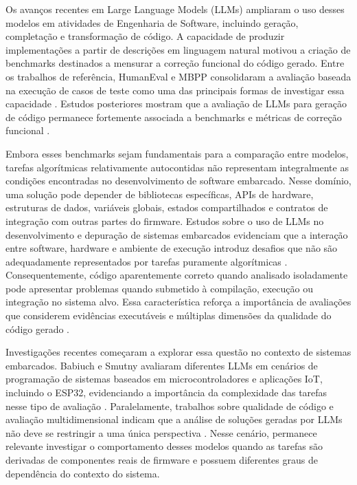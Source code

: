 \documentclass[12pt]{article}
\begin{document}
Os avanços recentes em Large Language Models (LLMs) ampliaram o uso desses modelos em atividades de Engenharia de Software, incluindo geração, completação e transformação de código. A capacidade de produzir implementações a partir de descrições em linguagem natural motivou a criação de benchmarks destinados a mensurar a correção funcional do código gerado. Entre os trabalhos de referência, HumanEval e MBPP consolidaram a avaliação baseada na execução de casos de teste como uma das principais formas de investigar essa capacidade \cite{chen2021codex,austin2021program}. Estudos posteriores mostram que a avaliação de LLMs para geração de código permanece fortemente associada a benchmarks e métricas de correção funcional \cite{umama2025slr}.

Embora esses benchmarks sejam fundamentais para a comparação entre modelos, tarefas algorítmicas relativamente autocontidas não representam integralmente as condições encontradas no desenvolvimento de software embarcado. Nesse domínio, uma solução pode depender de bibliotecas específicas, APIs de hardware, estruturas de dados, variáveis globais, estados compartilhados e contratos de integração com outras partes do firmware. Estudos sobre o uso de LLMs no desenvolvimento e depuração de sistemas embarcados evidenciam que a interação entre software, hardware e ambiente de execução introduz desafios que não são adequadamente representados por tarefas puramente algorítmicas \cite{englhardt2023embedded}. Consequentemente, código aparentemente correto quando analisado isoladamente pode apresentar problemas quando submetido à compilação, execução ou integração no sistema alvo. Essa característica reforça a importância de avaliações que considerem evidências executáveis e múltiplas dimensões da qualidade do código gerado \cite{nogueira2026probe}.

Investigações recentes começaram a explorar essa questão no contexto de sistemas embarcados. Babiuch e Smutny avaliaram diferentes LLMs em cenários de programação de sistemas baseados em microcontroladores e aplicações IoT, incluindo o ESP32, evidenciando a importância da complexidade das tarefas nesse tipo de avaliação \cite{babiuch2026benchmarking}. Paralelamente, trabalhos sobre qualidade de código e avaliação multidimensional indicam que a análise de soluções geradas por LLMs não deve se restringir a uma única perspectiva \cite{patcas2026quality,nogueira2026probe}. Nesse cenário, permanece relevante investigar o comportamento desses modelos quando as tarefas são derivadas de componentes reais de firmware e possuem diferentes graus de dependência do contexto do sistema.
\end{document}
